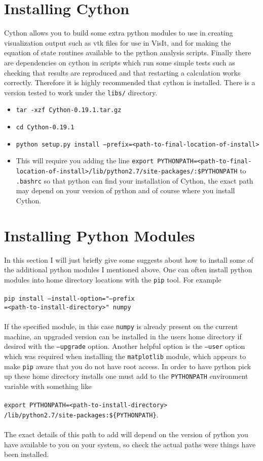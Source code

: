 \documentclass[12pt,a4paper]{book}
\begin{document}
\section{Installing Cython}
Cython allows you to build some extra python modules to use in creating visualization output such as vtk files for use in VisIt, and for making the equation of state routines available to the python analysis scripts. Finally there are dependencies on cython in scripts which run some simple tests such as checking that results are reproduced and that restarting a calculation works correctly. Therefore it is highly recommended that cython is installed. There is a version tested to work under the {\tt libs/} directory.
\begin{itemize}
\item {\tt tar -xzf Cython-0.19.1.tar.gz}
\item {\tt cd Cython-0.19.1}
\item {\tt  python setup.py install --prefix=<path-to-final-location-of-install>}
\item This will require you adding the  line {\tt export PYTHONPATH\-=<path-to-final-location-of-install>/\-lib/\-python2.7/\-site-packages/\-:\$PYTHONPATH} to {\tt .bashrc} so that python can find your installation of Cython, the exact path may depend on your version of python and of course where you install Cython.
\end{itemize}

\section{Installing Python Modules}
In this section I will just briefly give some suggests about how to install some of the additional python modules I mentioned above. One can often install python modules into home directory locations with the {\tt pip} tool. For example \\
 \\
{\tt pip install --install-option="--prefix}\\
{\tt=<path-to-install-directory>" numpy}\\
 \\
If the specified module, in this case {\tt numpy} is already present on the current machine, an upgraded version can be installed in the users home directory if desired with the {\tt --upgrade} option. Another helpful option is the {\tt --user} option which was required when installing the {\tt matplotlib} module, which appears to make {\tt pip} aware that you do not have root access. In order to have python pick up these home directory installs one must add to the {\tt PYTHONPATH} environment variable with something like \\
 \\
{\tt export PYTHONPATH=<path-to-install-directory>}\\
{\tt /lib/python2.7/site-packages:\$\{PYTHONPATH\}}.\\
 \\
The exact details of this path to add will depend on the version of python you have available to you on your system, so check the actual paths were things have been installed.
\end{document}
